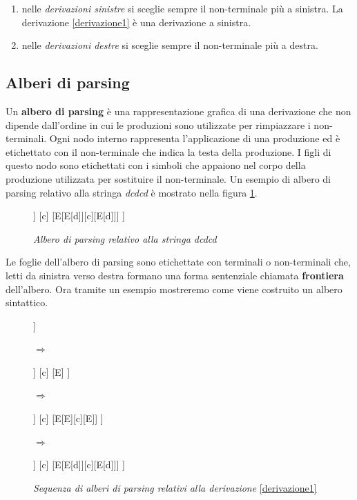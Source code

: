 \begin{enumerate}
	\item nelle \textit{derivazioni sinistre} si sceglie sempre il non-terminale più a sinistra. La derivazione \ref{derivazione1} è una derivazione a sinistra.
	\item  nelle \textit{derivazioni destre} si sceglie sempre il non-terminale più a destra. 
\end{enumerate}
\subsection{Alberi di parsing}
Un \textbf{albero di parsing} è \cite{libro: compilatori} una rappresentazione grafica di una derivazione che non dipende dall'ordine in cui le produzioni sono utilizzate per rimpiazzare i non-terminali. Ogni nodo interno rappresenta l'applicazione di una produzione ed è etichettato con il non-terminale che indica la testa della  produzione. I figli di questo nodo sono etichettati con i simboli che appaiono nel corpo della produzione utilizzata per sostituire il non-terminale. Un esempio di albero di parsing relativo alla stringa \textit{dcdcd} è mostrato nella figura \ref{fig:albero}.\par 
\begin{figure}[hbpb]
	\centering
	\begin{forest}
		[E
		[E[d]]
		[c]
		[E[E[d]][c][E[d]]]
		]
	\end{forest}
	\caption{\textit{Albero di parsing relativo alla stringa dcdcd} }\label{fig:albero}
\end{figure}
\noindent Le foglie dell'albero di parsing sono etichettate con terminali o non-terminali che, letti da sinistra verso destra formano una forma sentenziale chiamata \textbf{frontiera} dell'albero. Ora tramite un esempio mostreremo come viene costruito un albero sintattico. \par
\begin{figure}[hbpb]
	\centering
	\begin{forest}
		[E
		[E]
		[c]
		[E]
		]
	\end{forest}
	$\Rightarrow$    
	\begin{forest}
		[E
		[E[d]]
		[c]
		[E]
		]
	\end{forest}
	$\Rightarrow$    
	\begin{forest}
		[E
		[E[d]]
		[c]
		[E[E][c][E]]
		]	
	\end{forest}
	$\Rightarrow$    
	\begin{forest}
		[E
		[E[d]]
		[c]
		[E[E[d]][c][E[d]]]
		]
	\end{forest}
	\caption{\textit{Sequenza di alberi di parsing relativi alla derivazione }\ref{derivazione1}}\label{fig:passiAlbero}
\end{figure}
